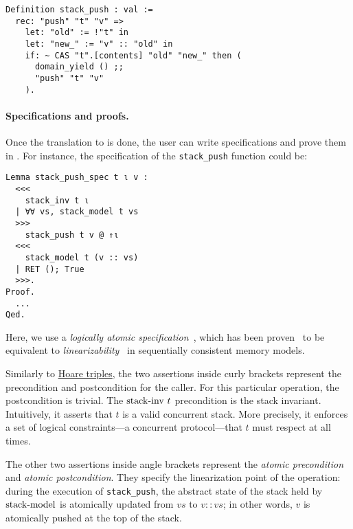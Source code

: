 \begin{verbatim}
Definition stack_push : val :=
  rec: "push" "t" "v" =>
    let: "old" := !"t" in
    let: "new_" := "v" :: "old" in
    if: ~ CAS "t".[contents] "old" "new_" then (
      domain_yield () ;;
      "push" "t" "v"
    ).
\end{verbatim}

\paragraph{Specifications and proofs.}

Once the translation to \ZooLang is done, the user can write specifications and prove them in \Iris.
For instance, the specification of the \texttt{stack_push} function could be:

\begin{verbatim}
Lemma stack_push_spec t ι v :
  <<<
    stack_inv t ι
  | ∀∀ vs, stack_model t vs
  >>>
    stack_push t v @ ↑ι
  <<<
    stack_model t (v :: vs)
  | RET (); True
  >>>.
Proof.
  ...
Qed.
\end{verbatim}

Here, we use a \emph{logically atomic specification}~\cite{DBLP:conf/ecoop/PintoDG14}, which has been proven~\cite{DBLP:journals/pacmpl/BirkedalDGJST21} to be equivalent to \emph{linearizability}~\cite{DBLP:journals/toplas/HerlihyW90} in sequentially consistent memory models.

Similarly to \href{https://en.wikipedia.org/wiki/Hoare_logic}{Hoare triples}, the two assertions inside curly brackets represent the precondition and postcondition for the caller.
For this particular operation, the postcondition is trivial.
The $\mathrm{stack {\hbox{-}} inv}\ t$ precondition is the stack invariant.
Intuitively, it asserts that $t$ is a valid concurrent stack.
More precisely, it enforces a set of logical constraints---a concurrent protocol---that $t$ must respect at all times.

The other two assertions inside angle brackets represent the \emph{atomic precondition} and \emph{atomic postcondition}.
They specify the linearization point of the operation: during the execution of \texttt{stack\_push}, the abstract state of the stack held by $\mathrm{stack {\hbox{-}} model}$ is atomically updated from $\mathit{vs}$ to $v :: \mathit{vs}$; in other words, $v$ is atomically pushed at the top of the stack.
